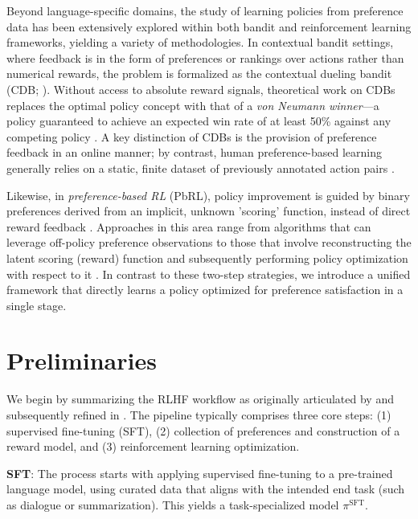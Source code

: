 Beyond language-specific domains, the study of learning policies from preference data has been extensively explored within both bandit and reinforcement learning frameworks, yielding a variety of methodologies. In contextual bandit settings, where feedback is in the form of preferences or rankings over actions rather than numerical rewards, the problem is formalized as the contextual dueling bandit (CDB; \cite{yue2012karmed,dudik2015contextual}). Without access to absolute reward signals, theoretical work on CDBs replaces the optimal policy concept with that of a \textit{von Neumann winner}—a policy guaranteed to achieve an expected win rate of at least 50\% against any competing policy \citep{dudik2015contextual}. A key distinction of CDBs is the provision of preference feedback in an online manner; by contrast, human preference-based learning generally relies on a static, finite dataset of previously annotated action pairs \citep{yan2022human}. 

Likewise, in \textit{preference-based RL} (PbRL), policy improvement is guided by binary preferences derived from an implicit, unknown 'scoring' function, instead of direct reward feedback \citep{BusaFekete2014,ruiz2023dueling}. Approaches in this area range from algorithms that can leverage off-policy preference observations to those that involve reconstructing the latent scoring (reward) function and subsequently performing policy optimization with respect to it \citep{jain2013learning,BusaFekete2014,christiano2017deep,sadigh2017active,kupcsik2018learning}. In contrast to these two-step strategies, we introduce a unified framework that directly learns a policy optimized for preference satisfaction in a single stage.

\section{Preliminaries}\label{section:prelims}

We begin by summarizing the RLHF workflow as originally articulated by \citeauthor{ziegler2020finetuning} and subsequently refined in \citep{stiennon2022learning, bai2022training, ouyang2022training}. The pipeline typically comprises three core steps: (1) supervised fine-tuning (SFT), (2) collection of preferences and construction of a reward model, and (3) reinforcement learning optimization.

\textbf{SFT}: The process starts with applying supervised fine-tuning to a pre-trained language model, using curated data that aligns with the intended end task (such as dialogue or summarization). This yields a task-specialized model $\pi^\text{SFT}$.

